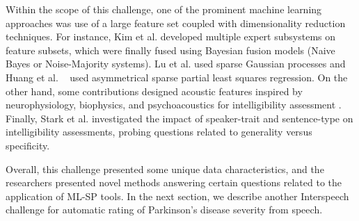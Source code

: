 \documentclass{article}
\begin{document}
Within the scope of this challenge, one of the prominent machine learning approaches was use of a large feature set coupled with dimensionality reduction techniques. For instance, Kim et al. \cite{kim2013pathology} developed multiple expert subsystems on feature subsets, which were finally fused using Bayesian fusion models (Naive Bayes or Noise-Majority systems). Lu et al. \cite{lu2012predicting} used sparse Gaussian processes and Huang et al. ~\cite{huang2012detecting} used asymmetrical sparse partial least squares regression. On the other hand, some contributions designed acoustic features inspired by neurophysiology, biophysics, and psychoacoustics for intelligibility assessment \cite{zhou2012automatic}. Finally, Stark et al. \cite{stark2012interspeech} investigated the impact of speaker-trait and sentence-type on intelligibility assessments, probing questions related to generality versus specificity.

Overall, this challenge presented some unique data characteristics, and the researchers presented novel methods answering certain questions related to the application of ML-SP tools. In the next section, we describe another Interspeech challenge for automatic rating of Parkinson's disease severity from speech. 


\end{document}
